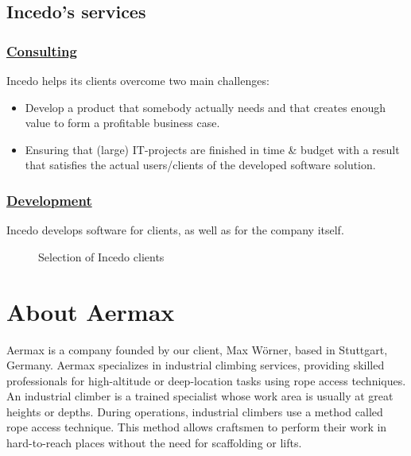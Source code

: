 \subsection{Incedo's services}
\subsubsection*{\underline{Consulting}}
Incedo helps its clients overcome two main challenges:
\begin{itemize}
    \item Develop a product that somebody actually needs and that creates enough value to form a profitable business case.
    \item Ensuring that (large) IT-projects are finished in time \& budget with a result that satisfies the actual users/clients of the developed software solution.
\end{itemize}

\subsubsection*{\underline{Development}}
Incedo develops software for clients, as well as for the company itself.
\begin{figure}[H]
    \centering
    \caption{Selection of Incedo clients}
    \label{fig:selection-of-incedo-clients}
\end{figure}

\section{About Aermax}

Aermax is a company founded by our client, Max Wörner, based in Stuttgart, Germany. Aermax specializes in industrial climbing services, providing skilled professionals for high-altitude or deep-location tasks using rope access techniques. An industrial climber is a trained specialist whose work area is usually at great heights or depths. During operations, industrial climbers use a method called rope access technique. This method allows craftsmen to perform their work in hard-to-reach places without the need for scaffolding or lifts.

